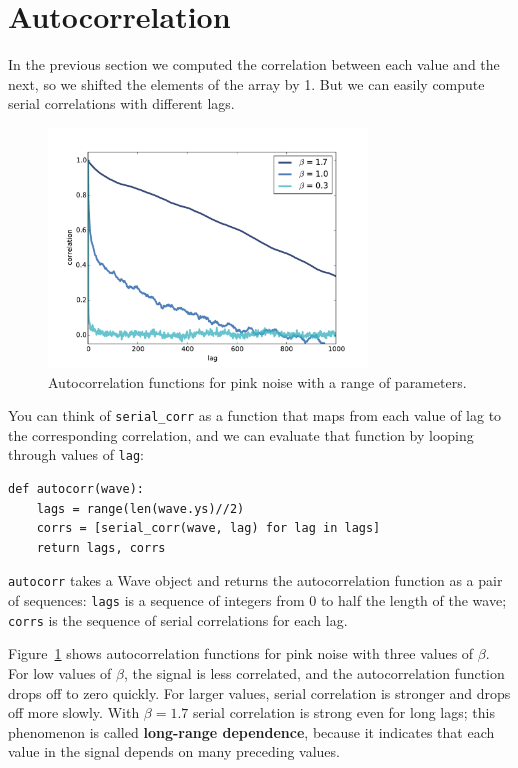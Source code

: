 \documentclass[12pt]{book}
\begin{document}
\section{Autocorrelation}

In the previous section we computed the correlation between each
value and the next, so we shifted the elements of the array by 1.
But we can easily compute serial correlations with
different lags.

\begin{figure}
\centerline{\includegraphics[height=2.5in]{figs/autocorr4.pdf}}
\caption{Autocorrelation functions for pink noise with a range
of parameters.}
\label{fig.autocorr4}
\end{figure}

You can think of \verb"serial_corr" as a function that
maps from each value of lag to the corresponding correlation, and we
can evaluate that function by looping through values of {\tt lag}:

\begin{verbatim}
def autocorr(wave):
    lags = range(len(wave.ys)//2)
    corrs = [serial_corr(wave, lag) for lag in lags]
    return lags, corrs
\end{verbatim}

{\tt autocorr} takes a Wave object and returns the autocorrelation
function as a pair of sequences: {\tt lags} is a sequence of
integers from 0 to half the length of the wave; {\tt corrs}
is the sequence of serial correlations for each lag.

Figure~\ref{fig.autocorr4} shows autocorrelation functions for pink
noise with three values of $\beta$.  For low values of $\beta$, the
signal is less correlated, and the autocorrelation function drops
off to zero quickly.  For larger values, serial correlation
is stronger and drops off more slowly.  With $\beta=1.7$ serial
correlation is strong even for long lags; this phenomenon is called
{\bf long-range dependence}, because it indicates that each value in
the signal depends on many preceding values.
\end{document}
